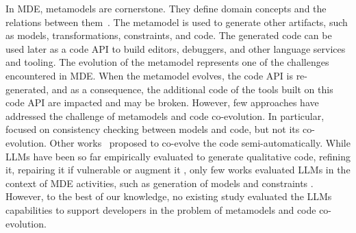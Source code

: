 In MDE, metamodels are cornerstone. They define domain concepts and the relations between them~\cite{cabot2012object}.
The metamodel is used to generate other artifacts, such as models, transformations, constraints, and code. The generated code can be used later as a code API to build editors, debuggers, and other language services and tooling. The evolution of the metamodel represents one of the %
challenges encountered in MDE. %
When the metamodel evolves, the code API is re-generated, and as a consequence, the additional code of the tools built on this code API are impacted and may be broken.
However, few approaches have addressed the challenge of metamodels and code co-evolution. 
In particular,~\cite{riedl2014towards,kanakis2019empirical,pham2017bidirectional,jongeling2020towards,jongeling2022Structural,zaheri2021towards} focused on consistency checking between models and code, but not its co-evolution. %
Other works~\cite{yu2012maintaining,Khelladi2020,khelladi2020power} proposed to co-evolve the code semi-automatically. %
While LLMs have been so far empirically evaluated to generate qualitative code, refining it, repairing it if vulnerable or augment it \cite{10109345,AbukhalafHK23,liu2023improving,hou2023large,pearce2022asleep,sobania2022choose,ziegler2022productivity,vaithilingam2022expectation,nguyen2022empirical,doderlein2022piloting,
nathalia2023artificial,yeticstiren2023evaluating,guo2023exploring,fu2023chatgpt,kabir2023empirical}, only few works evaluated LLMs in the context of MDE activities, such as generation of models and constraints \cite{chaaben2023towards,camara2023assessment,AbukhalafHK23}.
However, to the best of our knowledge, no existing study evaluated the LLMs capabilities %
to support developers in the problem of metamodels and code co-evolution. 

